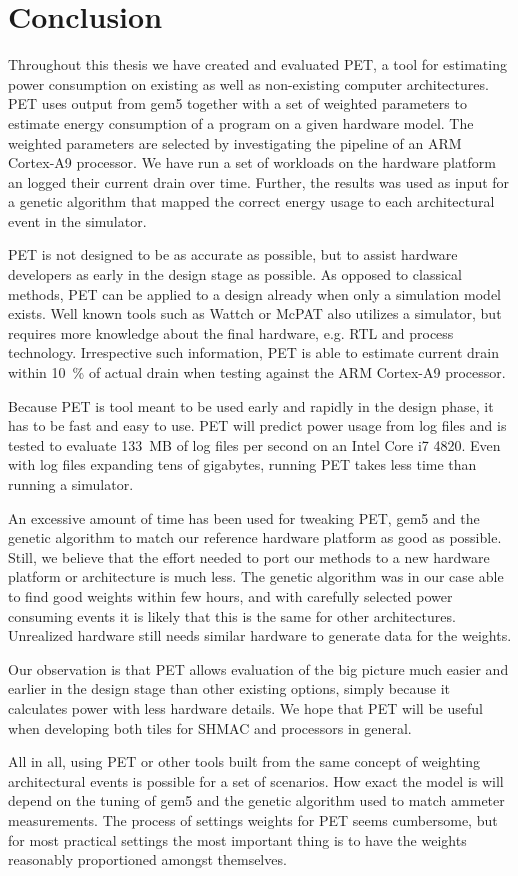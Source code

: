 \section{Conclusion}

Throughout this thesis we have created and evaluated PET, a tool for estimating
power consumption on existing as well as non-existing computer architectures.
PET uses output from gem5 together with a set of weighted parameters to estimate
energy consumption of a program on a given hardware model. The weighted
parameters are selected by investigating the pipeline of an ARM Cortex-A9
processor. We have run a set of workloads on the hardware platform an logged
their current drain over time. Further, the results was used as input for a
genetic algorithm that mapped the correct energy usage to each architectural
event in the simulator.

PET is not designed to be as accurate as possible, but to assist hardware
developers as early in the design stage as possible. As opposed to classical
methods, PET can be applied to a design already when only a simulation model
exists. Well known tools such as Wattch or McPAT also utilizes a simulator, but
requires more knowledge about the final hardware, e.g. RTL and process
technology. Irrespective such information, PET is able to estimate current drain
within 10~\% of actual drain when testing against the ARM Cortex-A9 processor.

Because PET is tool meant to be used early and rapidly in the design phase, it
has to be fast and easy to use. PET will predict power usage from log files and
is tested to evaluate 133~MB of log files per second on an Intel Core i7 4820.
Even with log files expanding tens of gigabytes, running PET takes less time
than running a simulator.

An excessive amount of time has been used for tweaking PET, gem5 and the genetic
algorithm to match our reference hardware platform as good as possible. Still,
we believe that the effort needed to port our methods to a new hardware platform
or architecture is much less. The genetic algorithm was in our case able to find
good weights within few hours, and with carefully selected power consuming
events it is likely that this is the same for other architectures. Unrealized
hardware still needs similar hardware to generate data for the weights.

Our observation is that PET allows evaluation of the big picture much easier and
earlier in the design stage than other existing options, simply because it
calculates power with less hardware details. We hope that PET will be useful
when developing both tiles for SHMAC and processors in general.

All in all, using PET or other tools built from the same concept of weighting
architectural events is possible for a set of scenarios. How exact the model is
will depend on the tuning of gem5 and the genetic algorithm used to match
ammeter measurements. The process of settings weights for PET seems cumbersome,
but for most practical settings the most important thing is to have the weights
reasonably proportioned amongst themselves.
